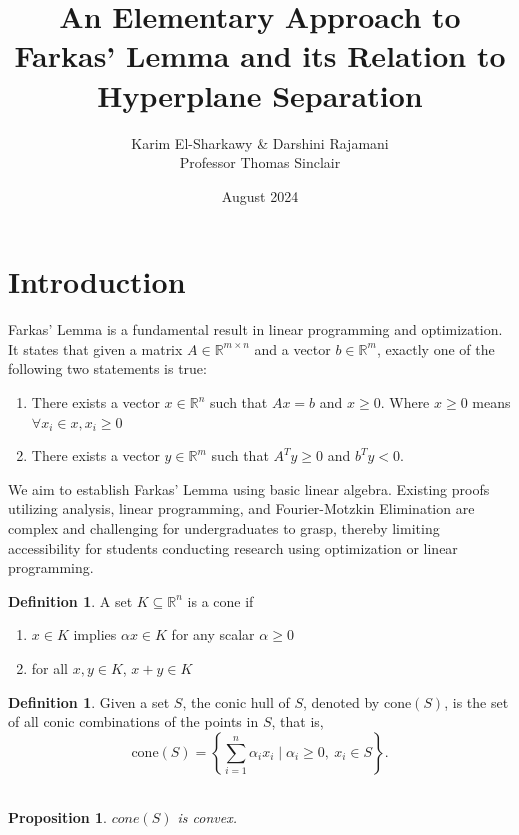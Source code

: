 \documentclass[11pt]{amsart} %
\title[Farkas' Lemma \& Hyperplane Separation]{An Elementary Approach to Farkas' Lemma and its Relation to Hyperplane Separation}
\author[El-Sharkawy, Rajamani, Sinclair]{Karim El-Sharkawy \& Darshini Rajamani \\ Professor Thomas Sinclair}
\date{August 2024}
\newtheorem{prop}[thm]{Proposition}
\theoremstyle{definition}
\newtheorem{defn}[thm]{Definition}
\begin{document}
\maketitle

\section{Introduction}

Farkas' Lemma is a fundamental result in linear programming and optimization. It states that given a matrix \( A \in \mathbb{R}^{m \times n} \) and a vector \( b \in \mathbb{R}^m \), exactly one of the following two statements is true:

\begin{enumerate}
    \item There exists a vector \( x \in \mathbb{R}^n \) such that \( Ax = b \) and \( x \geq 0 \).
    \subitem Where \( x \geq 0 \) means \(\forall x_i \in x, x_i \geq 0 \)
    \item There exists a vector \( y \in \mathbb{R}^m \) such that \( A^T y \ge 0 \) and \( b^T y < 0 \).
\end{enumerate}

We aim to establish Farkas' Lemma using basic linear algebra. Existing proofs utilizing analysis, linear programming, and Fourier-Motzkin Elimination are complex and challenging for undergraduates to grasp, thereby limiting accessibility for students conducting research using optimization or linear programming.

\begin{defn}
    A set \( K \subseteq \mathbb{R}^n \) is a cone if 

\begin{enumerate}
    \item \( x \in K \) implies \( \alpha x \in K \) for any scalar \( \alpha \geq 0 \)
    \item for all $x,y\in K$, $x + y\in K$
\end{enumerate}
\end{defn}

\begin{defn} Given a set \( S \), the conic hull of \( S \), denoted by \(\text{cone}(S)\), is the set of all conic combinations of the points in \( S \), that is,
\[
\text{cone}(S) = \left\{ \sum_{i=1}^n \alpha_i x_i \mid \alpha_i \geq 0, \ x_i \in S \right\}.
\]\\
\end{defn}

\begin{prop}
    \({cone(S)}\) is convex.
\end{prop}
\end{document}
